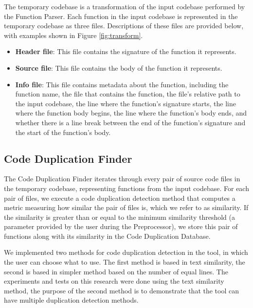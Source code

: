 The temporary codebase is a transformation of the input codebase performed by the Function Parser. Each function in the input codebase is represented in the temporary codebase as three files. Descriptions of these files are provided below, with examples shown in Figure \ref{fig:transform}.

\begin{itemize}
	\item \textbf{Header file}: This file contains the signature of the function it represents.
	\item \textbf{Source file}: This file contains the body of the function it represents.
	\item \textbf{Info file}: This file contains metadata about the function, including the function name, the file that contains the function, the file's relative path to the input codebase, the line where the function's signature starts, the line where the function body begins, the line where the function's body ends, and whether there is a line break between the end of the function's signature and the start of the function's body.
\end{itemize}

\subsection{Code Duplication Finder}

\label{subsec:code_finder}

The Code Duplication Finder iterates through every pair of source code files in the temporary codebase, representing 
functions from the input codebase. For each pair of files, we execute a code duplication detection method that computes 
a metric measuring how similar the pair of files is, which we refer to as similarity. 
If the similarity is greater than or equal to the minimum similarity threshold 
(a parameter provided by the user during the Preprocessor), we store this pair of functions along with its 
similarity in the Code Duplication Database.

We implemented two methods for code duplication detection in the tool, in which the user can choose what to use.
The first method is based in text similarity, the second is based in simpler method based on the number of equal lines.
The experiments and tests on this research were done using the text similarity method, the purpose of the 
second method is to demonstrate that the tool can have multiple duplication detection methods.

